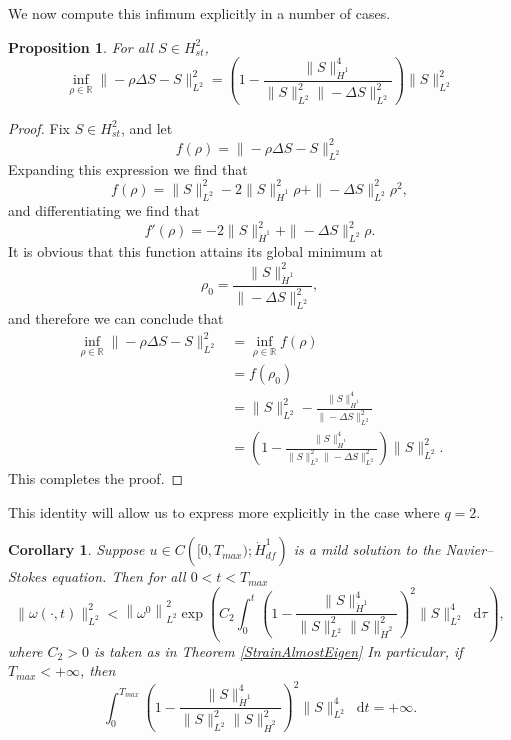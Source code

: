\documentclass[11pt]{article}
\theoremstyle{plain}
\newtheorem{corollary}[theorem]{Corollary}
\newtheorem{proposition}[theorem]{Proposition}
\theoremstyle{remark}
\numberwithin{equation}{section}
\newcommand{\diff}{\mathop{}\!\mathrm{d}}
\begin{document}
We now compute this infimum explicitly in a number of cases.



\begin{proposition} \label{L2inf}
For all $S\in H^2_{st}$,
\begin{equation}
    \inf_{\rho\in\mathbb{R}}\|-\rho\Delta S-S\|_{L^2}^2
    =\left(1-\frac{\|S\|_{\dot{H}^1}^4}
    {\|S\|_{L^2}^2\|-\Delta S\|_{L^2}^2}\right)
    \|S\|_{L^2}^2
\end{equation}
\end{proposition}


\begin{proof}
Fix $S\in H^2_{st}$, and let
\begin{equation}
    f(\rho)=\|-\rho\Delta S-S\|_{L^2}^2
\end{equation}
Expanding this expression we find that
\begin{equation}
    f(\rho)=\|S\|_{L^2}^2-2\|S\|_{\dot{H}^1}^2 \rho
    +\|-\Delta S\|_{L^2}^2 \rho^2,
\end{equation}
and differentiating we find that
\begin{equation}
    f'(\rho)=-2\|S\|_{\dot{H}^1}^2
    +\|-\Delta S\|_{L^2}^2 \rho.
\end{equation}
It is obvious that this function attains its global minimum at
\begin{equation}
    \rho_0=\frac{\|S\|_{\dot{H}^1}^2}{\|-\Delta S\|_{L^2}^2},
\end{equation}
and therefore we can conclude that
\begin{align}
    \inf_{\rho\in\mathbb{R}}\|-\rho\Delta S-S\|_{L^2}^2
    &=
    \inf_{\rho\in\mathbb{R}} f(\rho) \\
    &=
    f(\rho_0) \\
    &=
    \|S\|_{L^2}^2-
    \frac{\|S\|_{\dot{H}^1}^4}{\|-\Delta S\|_{L^2}^2} \\
    &=
    \left(1-\frac{\|S\|_{\dot{H}^1}^4}
    {\|S\|_{L^2}^2\|-\Delta S\|_{L^2}^2}\right)
    \|S\|_{L^2}^2.
\end{align}
This completes the proof.
\end{proof}

This identity will allow us to express  more explicitly in the case where $q=2$.


\begin{corollary}
Suppose $u\in C\left([0,T_{max});\dot{H}^1_{df}\right)$
is a mild solution to the Navier--Stokes equation.
Then for all $0<t<T_{max}$
\begin{equation} 
    \|\omega(\cdot,t)\|_{L^2}^2
    <\left\|\omega^0\right\|_{L^2}^2
    \exp\left(C_2 \int_0^t
    \left(1-\frac{\|S\|_{\dot{H}^1}^4}
    {\|S\|_{L^2}^2
    \|S\|_{\dot{H}^2}^2}\right)^2
    \|S\|_{L^2}^4 \diff\tau \right),
\end{equation}
where $C_2>0$ is taken as in Theorem \ref{StrainAlmostEigen}
In particular, if $T_{max}<+\infty$, then
\begin{equation}
    \int_0^{T_{max}}
    \left(1-\frac{\|S\|_{\dot{H}^1}^4}
    {\|S\|_{L^2}^2
    \|S\|_{\dot{H}^2}^2}\right)^2
    \|S\|_{L^2}^4 \diff t
    =+\infty.
\end{equation}
\end{corollary}
\end{document}
